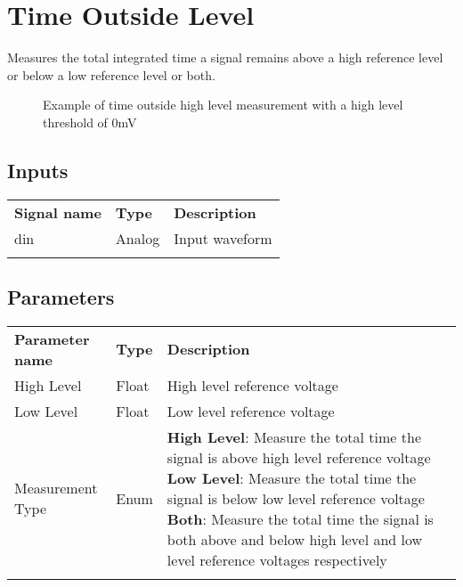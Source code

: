 \pagebreak
\section{Time Outside Level}

Measures the total integrated time a signal remains above a high reference level or below a low reference level or both.

\begin{figure}[h]
	\centering
	\caption{Example of time outside high level measurement with a high level threshold of 0mV}
	\label{filter_timeoutsidelevel}
	\end{figure}

\subsection{Inputs}

\begin{tabularx}{16cm}{llX}
\thickhline
\textbf{Signal name} & \textbf{Type} & \textbf{Description} \\
\thickhline
din & Analog & Input waveform \\
\thickhline
\end{tabularx}

\subsection{Parameters}

\begin{tabularx}{16cm}{llX}
\thickhline
\textbf{Parameter name} & \textbf{Type} & \textbf{Description} \\
\thickhline
High Level & Float & High level reference voltage\\
\thinhline
Low Level & Float & Low level reference voltage\\
\thinhline
Measurement Type & Enum &
	\textbf{High Level}: Measure the total time the signal is above high level reference voltage \newline
	\textbf{Low Level}: Measure the total time the signal is below low level reference voltage \newline
	\textbf{Both}: Measure the total time the signal is both above and below high level and low level reference voltages respectively\\
\thickhline
\end{tabularx}

